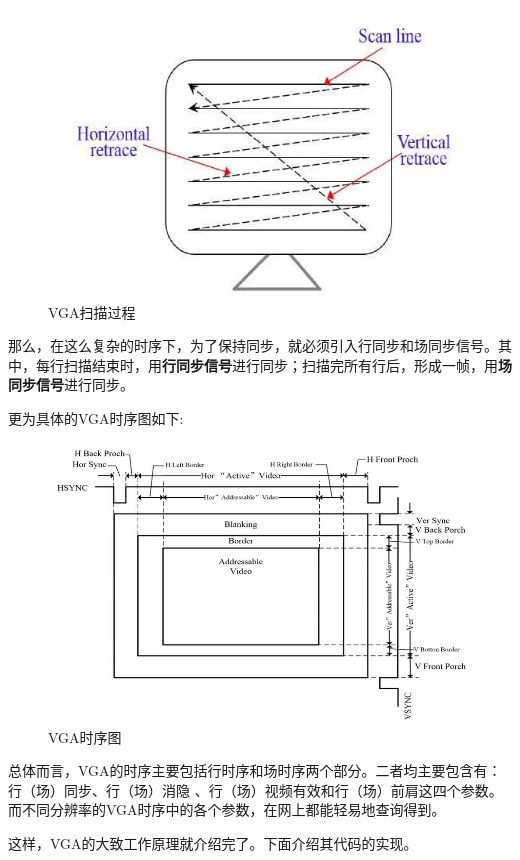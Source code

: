 \documentclass[UTF8]{article}
\begin{document}
	\begin{figure}[H]
		\centering
		\includegraphics[scale=0.5]{VGA_scan.jpg}
		\caption{VGA扫描过程}
		\label{VGA_scan}
	\end{figure}\par
	那么，在这么复杂的时序下，为了保持同步，就必须引入行同步和场同步信号。其中，每行扫描结束时，用\textbf{行同步信号}进行同步；扫描完所有行后，形成一帧，用\textbf{场同步信号}进行同步。\par
	更为具体的VGA时序图如下:\par
	\begin{figure}[H]
		\centering
		\includegraphics[scale=0.4]{VGA_sequence_chart.jpg}
		\caption{VGA时序图}
		\label{VGA_sequence_chart}
	\end{figure}\par
	总体而言，VGA的时序主要包括行时序和场时序两个部分。二者均主要包含有：行（场）同步、行（场）消隐 、行（场）视频有效和行（场）前肩这四个参数。而不同分辨率的VGA时序中的各个参数，在网上都能轻易地查询得到。\par
	这样，VGA的大致工作原理就介绍完了。下面介绍其代码的实现。\par
\end{document}
